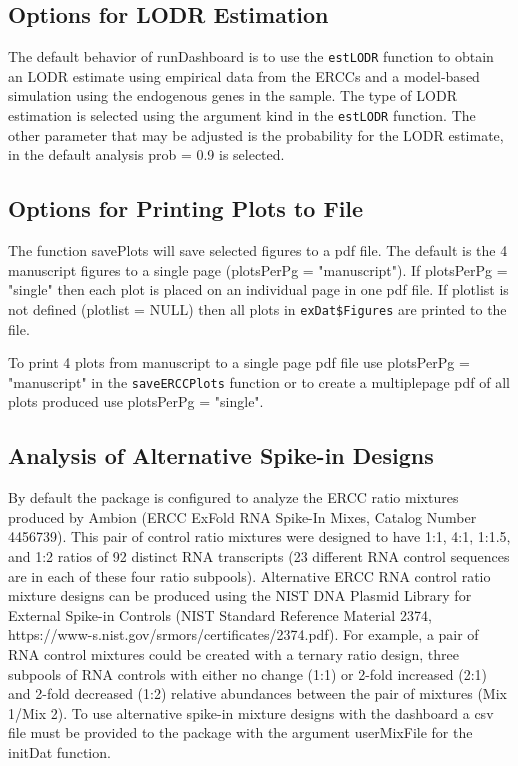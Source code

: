 \documentclass{article}
\begin{document}
\subsection{Options for LODR Estimation}
The default behavior of runDashboard is to use the \verb|estLODR| function to
obtain an LODR estimate using empirical data from the ERCCs and a model-based 
simulation using the endogenous genes in the sample. The type of LODR estimation
is selected using the argument kind in the \verb|estLODR| function. The other 
parameter that may be adjusted is the probability for the LODR estimate, in the 
default analysis prob = 0.9 is selected.

\subsection{Options for Printing Plots to File}
The function savePlots will save selected figures to a pdf file. The default 
is the 4 manuscript figures to a single page (plotsPerPg = "manuscript"). 
If plotsPerPg = "single" then each plot is placed on an 
individual page in one pdf file. If plotlist is not defined (plotlist = NULL)
then all plots in \verb|exDat$Figures| are printed to the file.

To print 4 plots from manuscript to a single page pdf file use 
plotsPerPg = "manuscript" in the \verb|saveERCCPlots| function or to create a 
multiplepage pdf of all plots produced use plotsPerPg = "single". 

\subsection{Analysis of Alternative Spike-in Designs}
By default the package is configured to analyze the ERCC ratio mixtures produced
by Ambion (ERCC ExFold RNA Spike-In Mixes, Catalog Number 4456739). This pair of
control ratio mixtures were designed to have 1:1, 4:1, 1:1.5, and 1:2 ratios of 92
distinct RNA transcripts (23 different RNA control sequences are in each of these 
four ratio subpools). Alternative ERCC RNA control ratio mixture designs can be 
produced using the NIST DNA Plasmid Library for External Spike-in Controls (NIST 
Standard Reference Material 2374, 
https://www-s.nist.gov/srmors/certificates/2374.pdf). For example, a pair of RNA
control mixtures could be created with a ternary ratio design, three subpools of 
RNA controls with either no change (1:1) or 2-fold increased (2:1) and 2-fold
decreased (1:2) relative abundances between the pair of mixtures (Mix 1/Mix 2).
To use alternative spike-in mixture designs with the dashboard a csv file must
be provided to the package with the argument userMixFile for the initDat function. 
\end{document}
